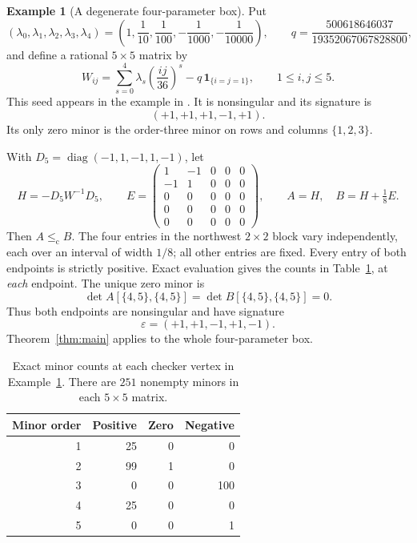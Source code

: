 \documentclass[10pt,a4paper]{article}
\theoremstyle{definition}
\newtheorem{example}[theorem]{Example}
\theoremstyle{remark}
\numberwithin{equation}{section}
\newcommand{\eps}{\varepsilon}
\newcommand{\chle}{\leq_{\mathrm c}}
\DeclareMathOperator{\diag}{diag}
\begin{document}
\begin{example}[A degenerate four-parameter box]\label{ex:degenerate}
Put
\[
 (\lambda_0,\lambda_1,\lambda_2,\lambda_3,\lambda_4)
 =\left(1,\frac1{10},\frac1{100},-\frac1{1000},-\frac1{10000}\right),
 \qquad
 q=\frac{500618646037}{19352067067828800},
\]
and define a rational $5\times5$ matrix by
\begin{equation}\label{eq:seed}
 W_{ij}=\sum_{s=0}^4\lambda_s\left(\frac{ij}{36}\right)^s
             -q\,\mathbf 1_{\{i=j=1\}},
 \qquad 1\leq i,j\leq5.
\end{equation}
This seed appears in the example in
\cite[Section~6]{HoldenGraph2026}. It is nonsingular and its
signature is
\[
 (+1,+1,+1,-1,+1).
\]
Its only zero minor is the
order-three minor on rows and columns $\{1,2,3\}$.

With $D_5=\diag(-1,1,-1,1,-1)$, let
\begin{equation}\label{eq:example-box}
 H=-D_5W^{-1}D_5,\qquad
 E=\begin{pmatrix}
 1&-1&0&0&0\\-1&1&0&0&0\\
 0&0&0&0&0\\0&0&0&0&0\\0&0&0&0&0
 \end{pmatrix},\qquad
 A=H,\quad B=H+\tfrac18 E.
\end{equation}
Then $A\chle B$. The four entries in the northwest $2\times2$
block vary independently, each over an interval of width $1/8$;
all other entries are fixed. Every entry of both endpoints is
strictly positive. Exact evaluation gives the counts in
Table~\ref{tab:example}, at \emph{each} endpoint. The unique
zero minor is
\begin{equation}\label{eq:zero-example}
 \det A[\{4,5\},\{4,5\}]
 =\det B[\{4,5\},\{4,5\}]=0.
\end{equation}
Thus both endpoints are nonsingular and have signature
\[
 \eps=(+1,+1,-1,+1,-1).
\]
Theorem~\ref{thm:main} applies to the whole four-parameter box.

\begin{table}[htbp]
\centering
\begin{tabular}{rrrr}
\toprule
Minor order & Positive & Zero & Negative\\
\midrule
1 & 25 & 0 & 0\\
2 & 99 & 1 & 0\\
3 & 0 & 0 & 100\\
4 & 25 & 0 & 0\\
5 & 0 & 0 & 1\\
\bottomrule
\end{tabular}
\caption{Exact minor counts at each checker vertex in
Example~\ref{ex:degenerate}. There are $251$ nonempty minors
in each $5\times5$ matrix.}\label{tab:example}
\end{table}


\end{example}
\end{document}
